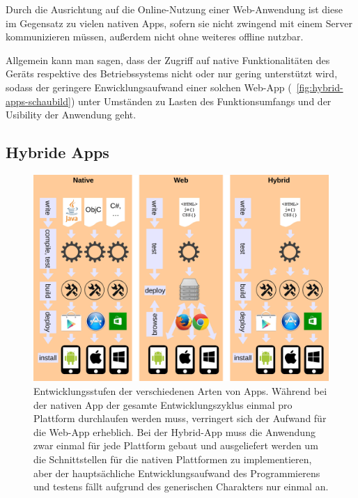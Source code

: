 Durch die Ausrichtung auf die Online-Nutzung einer Web-Anwendung ist diese im Gegensatz zu vielen nativen Apps, sofern sie nicht zwingend mit einem Server kommunizieren müssen, außerdem nicht ohne weiteres offline nutzbar.


Allgemein kann man sagen, dass der Zugriff auf native Funktionalitäten des Geräts respektive des Betriebssystems nicht oder nur gering unterstützt wird, sodass der geringere Enwicklungsaufwand einer solchen Web-App (\seename\  \autoref{fig:hybrid-apps-schaubild}) unter Umständen zu Lasten des Funktionsumfangs und der Usibility der Anwendung geht.

\subsection{Hybride Apps}



\begin{figure}
\centering
\includegraphics[width=1\linewidth]{./images/hybrid-apps-schaubild}
\caption[Schaubild Hybrid Apps]{Entwicklungsstufen der verschiedenen Arten von Apps. Während bei der nativen App der gesamte Entwicklungszyklus einmal pro Plattform durchlaufen werden muss, verringert sich der Aufwand für die Web-App erheblich. Bei der Hybrid-App muss die Anwendung zwar einmal für jede Plattform gebaut und ausgeliefert werden um die Schnittstellen für die nativen Plattformen zu implementieren, aber der hauptsächliche Entwicklungsaufwand des Programmierens und testens fällt aufgrund des generischen Charakters nur einmal an.}
\label{fig:hybrid-apps-schaubild}
\end{figure}


